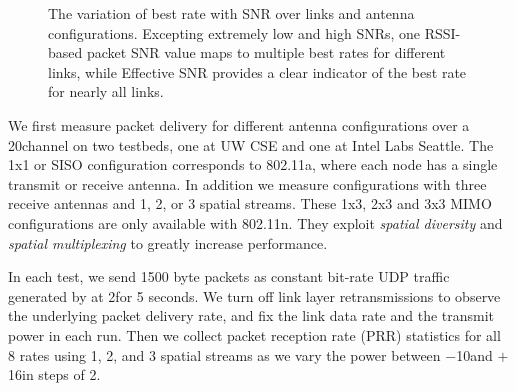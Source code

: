 \begin{figure}[ht]
	\hfill%
	\caption{\label{fig:snr_rate_steps}The variation of best rate with SNR over links and antenna configurations. Excepting extremely low and high SNRs, one RSSI-based packet SNR value maps to multiple best rates for different links, %
while Effective SNR provides a clear indicator of the best rate for nearly all links.}
\end{figure}

We first measure packet delivery for different antenna configurations over a 20\MHz channel on two  testbeds, one at UW CSE and one at Intel Labs Seattle. The 1x1 or SISO configuration corresponds to 802.11a, where each node has a single transmit or receive antenna. In addition we measure configurations with three receive antennas and 1, 2, or 3 spatial streams. These 1x3, 2x3 and 3x3 MIMO configurations are only available with 802.11n. They exploit \emph{spatial diversity} and \emph{spatial multiplexing} to greatly increase performance.

In each test, we send 1500 byte packets as constant bit-rate UDP traffic generated by  at 2\Mbps for 5 seconds. 
We turn off link layer retransmissions to observe the underlying packet delivery rate, and fix the link data rate and the transmit power in each run. Then we collect packet reception rate (PRR) statistics for all 8 rates using 1, 2, and 3 spatial streams as we vary the power between $-$10\dBm and $+$16\dBm in steps of 2\dB.

